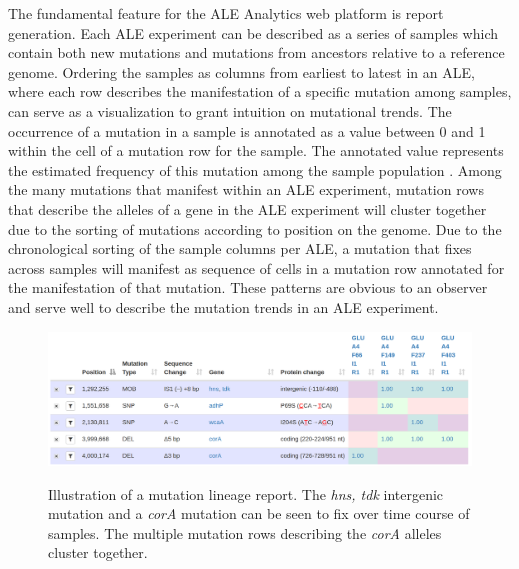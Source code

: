 \documentclass[12pt,final,masters,chapterheads]{ucsd}  %
\begin{document}
The fundamental feature for the ALE Analytics web platform is report generation. Each ALE experiment can be described as a series of samples which contain both new mutations and mutations from ancestors relative to a reference genome. Ordering the samples as columns from earliest to latest in an ALE, where each row describes the manifestation of a specific mutation among samples, can serve as a visualization to grant intuition on mutational trends. The occurrence of a mutation in a sample is annotated as a value between 0 and 1 within the cell of a mutation row for the sample. The annotated value represents the estimated frequency of this mutation among the sample population \cite{breseq_paper}. Among the many mutations that manifest within an ALE experiment, mutation rows that describe the alleles of a gene in the ALE experiment will cluster together due to the sorting of mutations according to position on the genome. Due to the chronological sorting of the sample columns per ALE, a mutation that fixes across samples will manifest as sequence of cells in a mutation row annotated for the manifestation of that mutation. These patterns are obvious to an observer and serve well to describe the mutation trends in an ALE experiment.

\begin{figure}[H]
  \caption{Illustration of a mutation lineage report. The \textit{hns, tdk} intergenic mutation and a \textit{corA} mutation can be seen to fix over time course of samples. The multiple mutation rows describing the \textit{corA} alleles cluster together.}
  \centering
  \includegraphics[width=1\textwidth]{mutation_lineage_report.png}
  \label{fig:mutation_lineage_report}
\end{figure}
\end{document}
